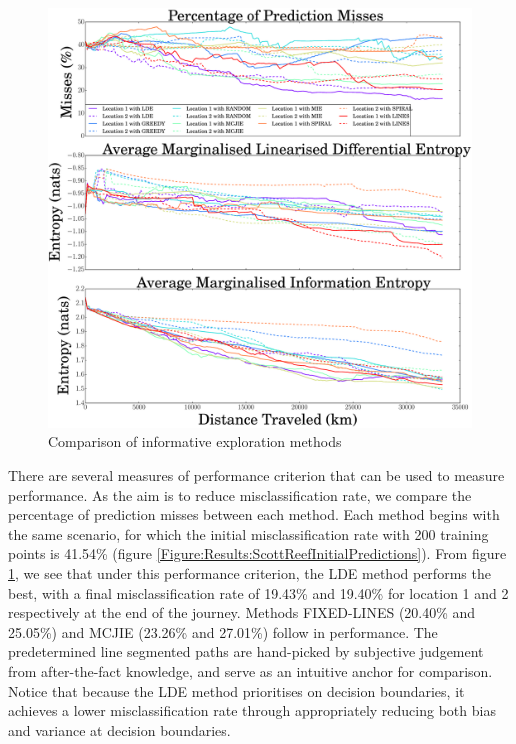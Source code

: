 \documentclass{article}
\begin{document}
		\begin{figure}[!htbp]
		\centering
			\includegraphics[width = \linewidth]{Figures/compare_methods.eps}
		\caption{Comparison of informative exploration methods}
		\label{Figure:Results:CompareMethods}
		\end{figure}
			
		There are several measures of performance criterion that can be used to measure performance. As the aim is to reduce misclassification rate, we compare the percentage of prediction misses between each method. Each method begins with the same scenario, for which the initial misclassification rate with 200 training points is 41.54\% (figure \ref{Figure:Results:ScottReefInitialPredictions}). From figure \ref{Figure:Results:CompareMethods}, we see that under this performance criterion, the LDE method performs the best, with a final misclassification rate of 19.43\% and 19.40\% for location 1 and 2 respectively at the end of the journey. Methods FIXED-LINES (20.40\% and 25.05\%) and MCJIE (23.26\% and 27.01\%) follow in performance. The predetermined line segmented paths are hand-picked by subjective judgement from after-the-fact knowledge, and serve as an intuitive anchor for comparison. Notice that because the LDE method prioritises on decision boundaries, it achieves a lower misclassification rate through appropriately reducing both bias and variance at decision boundaries.
			
\end{document}
